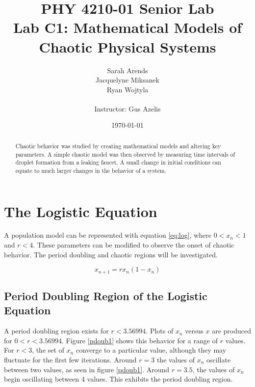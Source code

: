 \documentclass[a4paper]{article}
\title{PHY 4210-01 Senior Lab \\Lab C1:  Mathematical Models of Chaotic Physical Systems }
\author{Sarah Arends \\
        Jacquelyne Miksanek \\
        Ryan Wojtyla \\ \\
        Instructor: Gus Azelis}
\date{\today}
\begin{document}
\maketitle

\begin{abstract}
\qq Chaotic behavior was studied by creating mathematical models and altering key parameters. A simple chaotic model was then observed by measuring time intervals of droplet formation from a leaking faucet. A small change in initial conditions can equate to much larger changes in the behavior of a system.

\end{abstract}

\newpage

\tableofcontents

\newpage

\section{The Logistic Equation}
\qq A population model can be represented with equation \ref{eq:log}, where $0<x_n<1$ and $r<4$. These parameters can be modified to observe the onset of chaotic behavior. The period doubling and chaotic regions will be investigated.

\begin{equation}
x_{n+1} = r x_n (1-x_n)
\label{eq:log}
\end{equation}

\subsection{Period Doubling Region of the Logistic Equation}
\qq A period doubling region exists for $r<3.56994$. Plots of $x_n$ versus $x$ are produced for $0<r<3.56994$. Figure \ref{pdoub1} shows this behavior for a range of $r$ values. For $r<3$, the set of $x_n$ converge to a particular value, although they may fluctuate for the first few iterations. Around $r=3$ the values of $x_n$ oscillate between two values, as seen in figure \ref{pdoub1}. Around $r=3.5$, the values of $x_n$ begin oscillating between 4 values. This exhibits the period doubling region.
\end{document}
